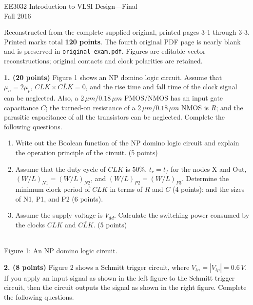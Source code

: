 \documentclass[10pt]{article}
\newcommand{\mos}[4]{\begin{scope}[shift={(#1,#2)}]
\draw(0,.24)--(0,-.24);\draw(0,.2)--(.25,.2)--(.25,.5);\draw(0,-.2)--(.25,-.2)--(.25,-.5);
\draw(-.16,.23)--(-.16,-.23);
\ifnum#4=1\draw(-.26,0)circle(.06);\draw(-.75,0)--(-.32,0);\else\draw(-.75,0)--(-.16,0);\fi
\node[anchor=east,font=\scriptsize]at(-.76,0){$#3$};\end{scope}}
\newcommand{\gnd}[2]{\draw(#1,#2)--(#1,{#2-.12});\draw({#1-.17},{#2-.12})--({#1+.17},{#2-.12});\draw({#1-.11},{#2-.2})--({#1+.11},{#2-.2});}
\newcommand{\rail}[3]{\draw(#1,#2)--(#1,{#2+.14});\node[above,font=\scriptsize]at(#1,{#2+.14}){$#3$};}
\begin{document}
\begin{center}{\Large EE3032 Introduction to VLSI Design---Final}\\Fall 2016\end{center}
Reconstructed from the complete supplied original, printed pages 3-1 through 3-3. Printed marks total \textbf{120 points}. The fourth original PDF page is nearly blank and is preserved in \texttt{original-exam.pdf}. Figures are editable vector reconstructions; original contacts and clock polarities are retained.
\par\medskip
\textbf{1. (20 points)} Figure 1 shows an NP domino logic circuit. Assume that $\mu_n=2\mu_p$, $CLK\times\overline{CLK}=0$, and the rise time and fall time of the clock signal can be neglected. Also, a $2\,\mu m/0.18\,\mu m$ PMOS/NMOS has an input gate capacitance $C$; the turned-on resistance of a $2\,\mu m/0.18\,\mu m$ NMOS is $R$; and the parasitic capacitance of all the transistors can be neglected. Complete the following questions.
\begin{enumerate}[label=(\alph*)]
\item Write out the Boolean function of the NP domino logic circuit and explain the operation principle of the circuit. (5 points)
\item Assume that the duty cycle of $CLK$ is 50\%, $t_r=t_f$ for the nodes X and Out, $(W/L)_{N1}=(W/L)_{N2}$, and $(W/L)_{P2}=(W/L)_{P3}$. Determine the minimum clock period of $CLK$ in terms of $R$ and $C$ (4 points); and the sizes of N1, P1, and P2 (6 points).
\item Assume the supply voltage is $V_{dd}$. Calculate the switching power consumed by the clocks $CLK$ and $\overline{CLK}$. (5 points)
\end{enumerate}\begin{center}\\Figure 1: An NP domino logic circuit.\end{center}\newpage\textbf{2. (8 points)} Figure 2 shows a Schmitt trigger circuit, where $V_{tn}=|V_{tp}|=0.6\,V$. If you apply an input signal as shown in the left figure to the Schmitt trigger circuit, then the circuit outputs the signal as shown in the right figure. Complete the following questions.
\end{document}
